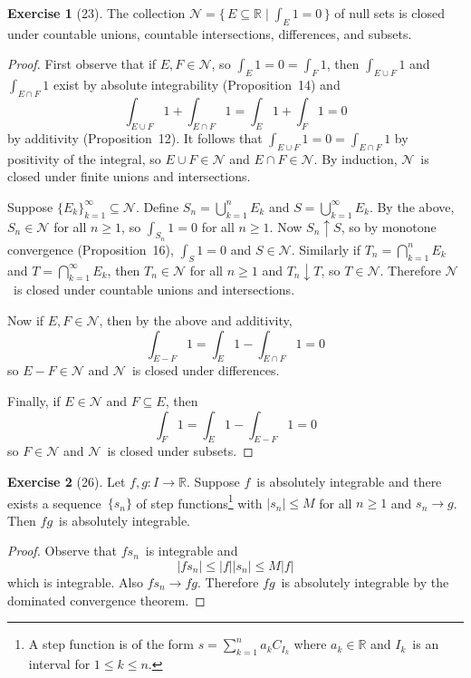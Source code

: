 \documentclass[letterpaper,12pt]{article}
\newcommand{\R}{\mathbb{R}}
\newcommand{\Null}{\mathcal{N}}
\newcommand{\upto}{\uparrow}
\newcommand{\downto}{\downarrow}
\newcommand{\union}{\cup}
\newcommand{\sect}{\cap}
\newcommand{\bigunion}{\bigcup}
\newcommand{\bigsect}{\bigcap}
\newcommand{\abs}[1]{|{#1}|}
\theoremstyle{plain}
\theoremstyle{definition}
\newtheorem*{exer}{Exercise}
\theoremstyle{remark}
\begin{document}
\begin{exer}[23]
The collection \(\Null=\{\,E\subseteq\R\mid\int_E 1=0\,\}\) of null sets is closed under countable unions, countable intersections, differences, and subsets.
\end{exer}
\begin{proof}
First observe that if \(E,F\in\Null\), so \(\int_E 1=0=\int_F 1\), then \(\int_{E\union F}1\) and \(\int_{E\sect F}1\) exist by absolute integrability (Proposition~14) and
\[\int_{E\union F}1+\int_{E\sect F}1=\int_E 1+\int_F 1=0\]
by additivity (Proposition~12). It follows that \(\int_{E\union F}1=0=\int_{E\sect F}1\) by positivity of the integral, so \(E\union F\in\Null\) and \(E\sect F\in\Null\). By induction, \(\Null\)~is closed under finite unions and intersections.

Suppose \(\{E_k\}_{k=1}^{\infty}\subseteq\Null\). Define \(S_n=\bigunion_{k=1}^n E_k\) and \(S=\bigunion_{k=1}^{\infty}E_k\). By the above, \(S_n\in\Null\) for all \(n\ge 1\), so \(\int_{S_n}1=0\) for all \(n\ge 1\). Now \(S_n\upto S\), so by monotone convergence (Proposition~16), \(\int_S 1=0\) and \(S\in\Null\). Similarly if \(T_n=\bigsect_{k=1}^n E_k\) and \(T=\bigsect_{k=1}^{\infty}E_k\), then \(T_n\in\Null\) for all \(n\ge 1\) and \(T_n\downto T\), so \(T\in\Null\). Therefore \(\Null\)~is closed under countable unions and intersections.

Now if \(E,F\in\Null\), then by the above and additivity,
\[\int_{E-F}1=\int_E 1-\int_{E\sect F} 1=0\]
so \(E-F\in\Null\) and \(\Null\)~is closed under differences.

Finally, if \(E\in\Null\) and \(F\subseteq E\), then
\[\int_F 1=\int_E 1-\int_{E-F}1=0\]
so \(F\in\Null\) and \(\Null\)~is closed under subsets.
\end{proof}

\begin{exer}[26]
Let \(f,g:I\to\R\). Suppose \(f\)~is absolutely integrable and there exists a sequence~\(\{s_n\}\) of step functions\footnote{A step function is of the form \(s=\sum_{k=1}^n a_kC_{I_k}\) where \(a_k\in\R\) and \(I_k\)~is an interval for \(1\le k\le n\).} with \(\abs{s_n}\le M\) for all \(n\ge 1\) and \(s_n\to g\). Then \(fg\)~is absolutely integrable.
\end{exer}
\begin{proof}
Observe that \(fs_n\)~is integrable and
\[\abs{fs_n}\le\abs{f}\abs{s_n}\le M\abs{f}\]
which is integrable. Also \(fs_n\to fg\). Therefore \(fg\)~is absolutely integrable by the dominated convergence theorem.
\end{proof}
\end{document}
